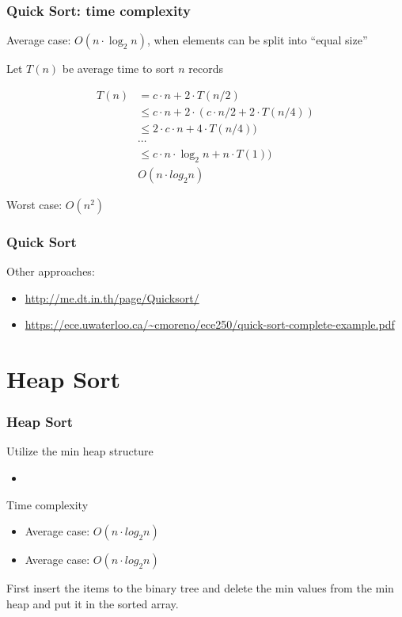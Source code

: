 \documentclass[newPxFont,sthlmFooter,nooffset]{beamer}
\begin{document}
\begin{frame}[t]
  \frametitle{Quick Sort: time complexity}
Average case: $O(n \cdot \log_{2}n)$, when elements can be split into ``equal size''

Let $T(n)$ be average time to sort $n$ records

\begin{align*}
T(n) & =  c \cdot n + 2 \cdot T(n/2) \\
     &\leq c \cdot n + 2 \cdot (c \cdot n/2 + 2 \cdot T(n/4)) \\
     &\leq 2 \cdot c \cdot n + 4 \cdot T(n/4)) \\
     & \cdots \\
     &\leq c \cdot n \cdot \log_{2}n + n \cdot T(1)) \\
     & O(n\cdot log_2n)
\end{align*}

Worst case: $O(n^2)$
\end{frame}


\begin{frame}[t]
  \frametitle{Quick Sort}
  Other approaches: 
  \begin{itemize}
  \item     \url{http://me.dt.in.th/page/Quicksort/}
  \item     \url{https://ece.uwaterloo.ca/~cmoreno/ece250/quick-sort-complete-example.pdf}
  \end{itemize}
\end{frame}


\section{Heap Sort}
\begin{frame}[t]
  \frametitle{Heap Sort}
Utilize the min heap structure
\begin{itemize}
\item<implement min heap with array> 
\end{itemize}

Time complexity
\begin{itemize}
\item Average case: $O(n \cdot log_2n)$
\item Average case: $O(n \cdot log_2n)$
\end{itemize}

First insert the items to the binary tree and delete the min values from the min heap and put it in the sorted array.
\end{frame}
\end{document}
